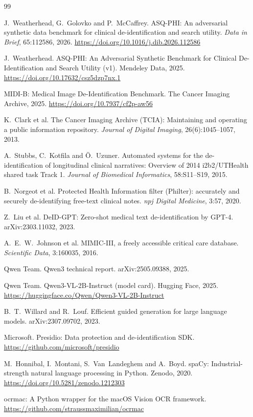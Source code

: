 \documentclass[11pt,a4paper]{article}
\begin{document}
\small
\begin{thebibliography}{99}
\setlength{\itemsep}{0pt}

J.~Weatherhead, G.~Golovko and P.~McCaffrey.
ASQ-PHI: An adversarial synthetic data benchmark for clinical de-identification and search utility.
\emph{Data in Brief}, 65:112586, 2026. \url{https://doi.org/10.1016/j.dib.2026.112586}

J.~Weatherhead.
ASQ-PHI: An Adversarial Synthetic Benchmark for Clinical De-Identification and Search Utility (v1).
Mendeley Data, 2025. \url{https://doi.org/10.17632/csz5dzp7nx.1}

MIDI-B: Medical Image De-Identification Benchmark.
The Cancer Imaging Archive, 2025. \url{https://doi.org/10.7937/cf2p-aw56}

K.~Clark et al.
The Cancer Imaging Archive (TCIA): Maintaining and operating a public information repository.
\emph{Journal of Digital Imaging}, 26(6):1045--1057, 2013.

A.~Stubbs, C.~Kotfila and Ö.~Uzuner.
Automated systems for the de-identification of longitudinal clinical narratives: Overview of 2014 i2b2/UTHealth shared task Track 1.
\emph{Journal of Biomedical Informatics}, 58:S11--S19, 2015.

B.~Norgeot et al.
Protected Health Information filter (Philter): accurately and securely de-identifying free-text clinical notes.
\emph{npj Digital Medicine}, 3:57, 2020.

Z.~Liu et al.
DeID-GPT: Zero-shot medical text de-identification by GPT-4.
arXiv:2303.11032, 2023.

A.~E.~W.~Johnson et al.
MIMIC-III, a freely accessible critical care database.
\emph{Scientific Data}, 3:160035, 2016.

Qwen Team.
Qwen3 technical report.
arXiv:2505.09388, 2025.

Qwen Team.
Qwen3-VL-2B-Instruct (model card).
Hugging Face, 2025. \url{https://huggingface.co/Qwen/Qwen3-VL-2B-Instruct}

B.~T.~Willard and R.~Louf.
Efficient guided generation for large language models.
arXiv:2307.09702, 2023.

Microsoft.
Presidio: Data protection and de-identification SDK.
\url{https://github.com/microsoft/presidio}

M.~Honnibal, I.~Montani, S.~Van~Landeghem and A.~Boyd.
spaCy: Industrial-strength natural language processing in Python.
Zenodo, 2020. \url{https://doi.org/10.5281/zenodo.1212303}

ocrmac: A Python wrapper for the macOS Vision OCR framework.
\url{https://github.com/straussmaximilian/ocrmac}

\end{thebibliography}
\end{document}
